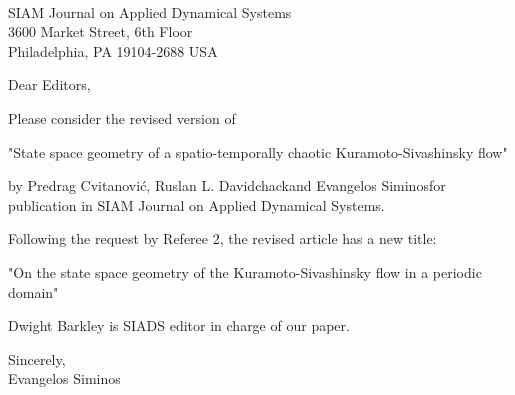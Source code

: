 \documentclass[12pt]{letter}
\date{April 10, 2009}
\begin{document}
\begin{letter}{
\\
SIAM Journal on Applied Dynamical Systems\\
3600 Market Street, 6th Floor\\
Philadelphia, PA 19104-2688 USA
}


\opening{Dear Editors,}

Please consider the revised version of

"State space geometry of a spatio-temporally chaotic Kuramoto-Sivashinsky flow"

by Predrag Cvitanovi\'c\footnotemark[1], Ruslan L. Davidchack\footnotemark[2]
and Evangelos Siminos\footnotemark[1] for publication in SIAM Journal on
Applied Dynamical Systems.

Following the request by Referee 2, the revised article has a new title:

"On the state space geometry of the
Kuramoto-Sivashinsky flow in a periodic domain"


Dwight Barkley is SIADS editor in charge of our paper.

\renewcommand{\thefootnote}{\fnsymbol{footnote}}
\renewcommand{\thefootnote}{\arabic{footnote}}

\closing{Sincerely,\\ Evangelos Siminos}


\end{letter}
\end{document}
